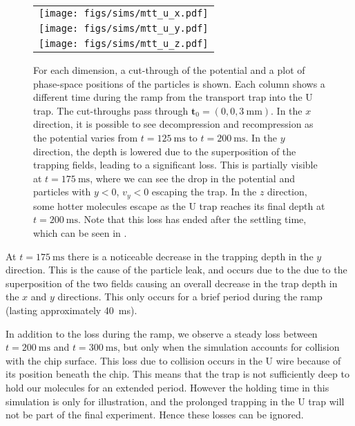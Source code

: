 \begin{figure}[p]
\centering
  \begin{tabular}{c}
    \texttt{[image: figs/sims/mtt\_u\_x.pdf]} \\
    \texttt{[image: figs/sims/mtt\_u\_y.pdf]} \\
    \texttt{[image: figs/sims/mtt\_u\_z.pdf]}
  \end{tabular}
  \caption{
    For each dimension, a cut-through of the potential and a plot of
    phase-space positions of the particles is shown. Each column shows a
    different time during the ramp from the transport trap into the U trap. The
    cut-throughs pass through $\mathbf{t}_0 = (0, 0, \SI{3}{\milli\meter})$. In
    the $x$ direction, it is possible to see decompression and recompression as
    the potential varies from $t=\SI{125}{\milli\second}$ to
    $t=\SI{200}{\milli\second}$. In the $y$ direction, the depth is lowered due
    to the superposition of the trapping fields, leading to a significant loss.
    This is partially visible at $t=\SI{175}{\milli\second}$, where we can see
    the drop in the potential and particles with $y<0$, $v_y<0$ escaping the
    trap. In the $z$ direction, some hotter molecules escape as the U trap
    reaches its final depth at $t=\SI{200}{\milli\second}$. Note that this loss
    has ended after the settling time, which can be seen in
    .
  }
  \label{design:fig:trans_U}
\end{figure}

At $t=\SI{175}{\milli\second}$ there is a noticeable decrease in the trapping
depth in the $y$ direction. This is the cause of the particle leak, and occurs
due to the due to the superposition of the two fields causing an overall
decrease in the trap depth in the $x$ and $y$ directions. This only occurs for
a brief period during the ramp (lasting approximately \SI{40}{\milli\second}). 

In addition to the loss during the ramp, we observe a steady loss between
$t=\SI{200}{\milli\second}$ and $t=\SI{300}{\milli\second}$, but only when the
simulation accounts for collision with the chip surface. This loss due to
collision occurs in the U wire because of its position beneath the chip. This
means that the trap is not sufficiently deep to hold our molecules for an
extended period. However the holding time in this simulation is only for
illustration, and the prolonged trapping in the U trap will not be part of the
final experiment. Hence these losses can be ignored.

